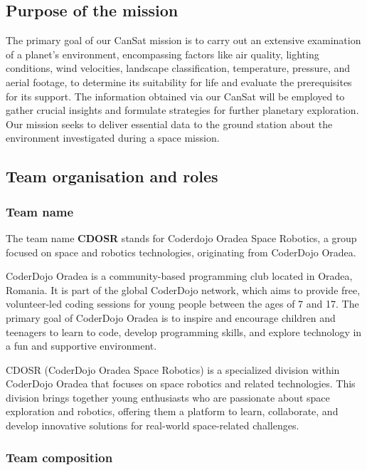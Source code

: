 \documentclass[11pt]{article}
\begin{document}
\subsection{Purpose of the mission}

The primary goal of our CanSat mission is to carry out an extensive examination of a planet's environment, encompassing factors like air quality, lighting conditions, wind velocities, landscape classification, temperature, pressure, and aerial footage, to determine its suitability for life and evaluate the prerequisites for its support. The information obtained via our CanSat will be employed to gather crucial insights and formulate strategies for further planetary exploration. Our mission seeks to deliver essential data to the ground station about the environment investigated during a space mission.

\subsection{Team organisation and roles}

\subsubsection{Team name}
The team name {\textbf{CDOSR}} stands for Coderdojo Oradea Space Robotics, a group focused on space and robotics technologies, originating from CoderDojo Oradea. 

CoderDojo Oradea is a community-based programming club located in Oradea, Romania. It is part of the global CoderDojo network, which aims to provide free, volunteer-led coding sessions for young people between the ages of 7 and 17. The primary goal of CoderDojo Oradea is to inspire and encourage children and teenagers to learn to code, develop programming skills, and explore technology in a fun and supportive environment.

CDOSR (CoderDojo Oradea Space Robotics) is a specialized division within CoderDojo Oradea that focuses on space robotics and related technologies. This division brings together young enthusiasts who are passionate about space exploration and robotics, offering them a platform to learn, collaborate, and develop innovative solutions for real-world space-related challenges.

\subsubsection{Team composition}
\end{document}
